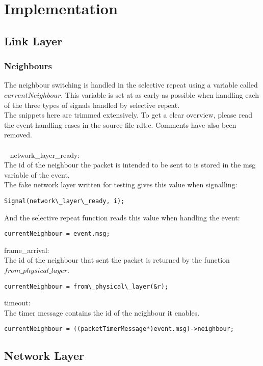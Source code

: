 \section{Implementation}

\subsection{Link Layer}
\subsubsection{Neighbours}
The neighbour switching is handled in the selective repeat using a variable called $currentNeighbour$. This variable is set at as early as possible when handling each of the three types of signals handled by selective repeat.\\
The snippets here are trimmed extensively. To get a clear overview, please read the event handling cases in the source file rdt.c. Comments have also been removed.\\
\\~
network\_layer\_ready:\\
The id of the neighbour the packet is intended to be sent to is stored in the msg variable of the event.\\
The fake network layer written for testing gives this value when signalling:
\begin{lstlisting}
Signal(network\_layer\_ready, i);
\end{lstlisting}
And the selective repeat function reads this value when handling the event:
\begin{lstlisting}
currentNeighbour = event.msg;
\end{lstlisting}

frame\_arrival:\\
The id of the neighbour that sent the packet is returned by the function $from\_physical\_layer$.
\begin{lstlisting}
currentNeighbour = from\_physical\_layer(&r);
\end{lstlisting}

timeout:\\
The timer message contains the id of the neighbour it enables.
\begin{lstlisting}
currentNeighbour = ((packetTimerMessage*)event.msg)->neighbour;
\end{lstlisting}

\subsection{Network Layer}
